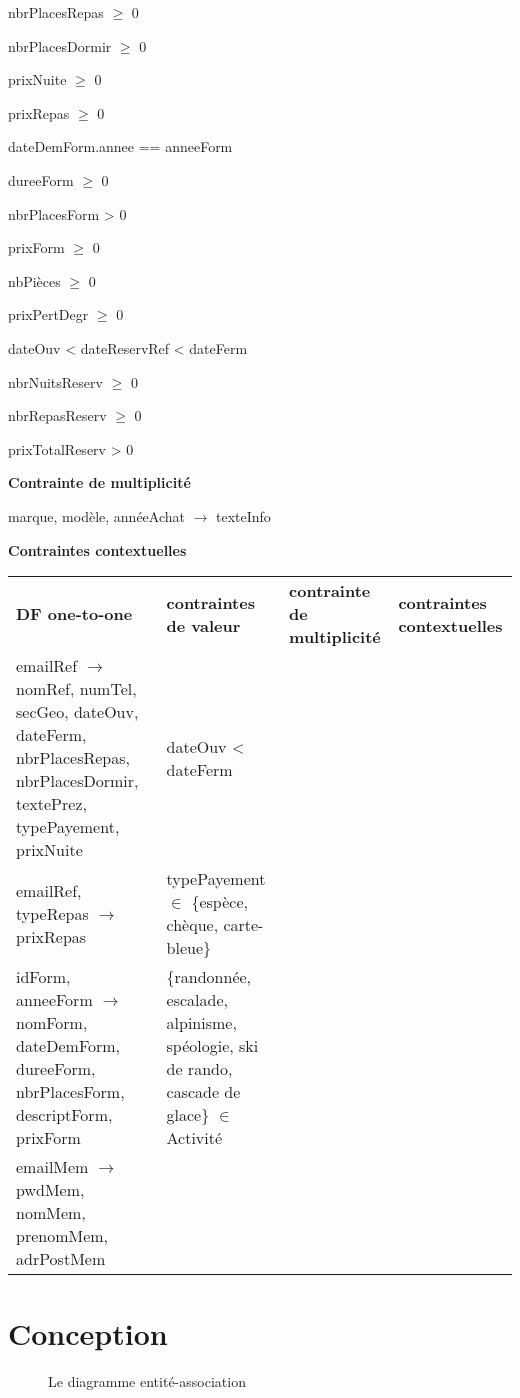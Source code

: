 \documentclass[12pt, a4paper]{article}
\begin{document}
nbrPlacesRepas $\geq$ 0

nbrPlacesDormir $\geq$ 0

prixNuite $\geq$ 0

prixRepas $\geq$ 0

dateDemForm.annee == anneeForm

dureeForm $\geq$ 0

nbrPlacesForm > 0

prixForm $\geq$ 0

nbPièces $\geq$ 0

prixPertDegr $\geq$ 0

dateOuv < dateReservRef < dateFerm

nbrNuitsReserv $\geq$ 0

nbrRepasReserv $\geq$ 0

prixTotalReserv > 0

\textbf{Contrainte de multiplicité}

marque, modèle, annéeAchat $\rightarrow$ texteInfo

\textbf{Contraintes contextuelles}

\begin{table}[h]
\scriptsize
\begin{tabular}{llll}
  \textbf{DF one-to-one} & \textbf{contraintes de valeur} & \textbf{contrainte de multiplicité} & \textbf{contraintes contextuelles} \\
  
  emailRef $\rightarrow$ nomRef, numTel, secGeo, dateOuv, dateFerm, nbrPlacesRepas, nbrPlacesDormir, textePrez, typePayement, prixNuite & dateOuv < dateFerm & & \\
  
  emailRef, typeRepas $\rightarrow$ prixRepas & typePayement $\in$ \{espèce, chèque, carte-bleue\} & & \\
  
  idForm, anneeForm $\rightarrow$ nomForm, dateDemForm, dureeForm, nbrPlacesForm, descriptForm, prixForm & \{randonnée, escalade, alpinisme, spéologie, ski de rando, cascade de glace\} $\in$ Activité & & \\
  
  emailMem $\rightarrow$ pwdMem, nomMem, prenomMem, adrPostMem & & & \\
  
  
  
  
\end{tabular}
\end{table}
\section{Conception}
\begin{figure}[h]

\caption{Le diagramme entité-association}
\end{figure}
\end{document}
